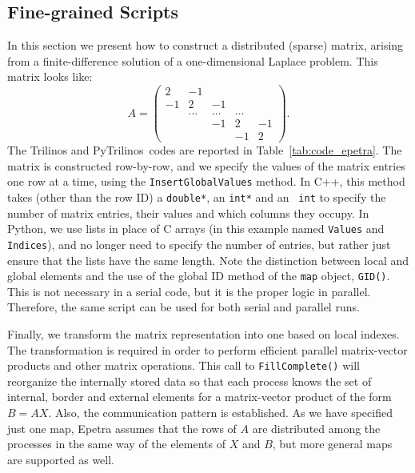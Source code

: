 \documentclass[acmtocl]{acmtrans2m}
\newcommand{\PyTrilinos}{{PyTrilinos}}
\begin{document}
\subsection{Fine-grained Scripts}
\label{sec:fine}

In this section we present how to construct a distributed (sparse)
matrix, arising from a finite-difference solution of a one-dimensional
Laplace problem.  This matrix looks like:
\begin{equation*}
  A = \begin{pmatrix}
     2 & -1     &        &        &    \\
    -1 &  2     & -1     &        &    \\
       & \ldots & \ldots & \ldots &    \\
       &        & -1     & 2      & -1 \\
       &        &        & -1     & 2
  \end{pmatrix}.
\end{equation*}
The Trilinos and \PyTrilinos\ codes are reported in
Table~\ref{tab:code_epetra}.  The matrix is constructed row-by-row,
and we specify the values of the matrix entries one row at a time,
using the {\tt InsertGlobalValues} method.  In C++, this method takes
(other than the row ID) a {\tt double*}, an {\tt int*} and an {\tt
  int} to specify the number of matrix entries, their values and which
columns they occupy.  In Python, we use lists in place of C arrays (in
this example named {\tt Values} and {\tt Indices}), and no longer need
to specify the number of entries, but rather just ensure that the
lists have the same length.  Note the distinction between local and
global elements and the use of the global ID method of the {\tt map}
object, {\tt GID()}.  This is not necessary in a serial code, but it
is the proper logic in parallel.  Therefore, the same script can be
used for both serial and parallel runs.

Finally, we transform the matrix representation into one based on
local indexes.  The transformation is required in order to perform
efficient parallel matrix-vector products and other matrix operations.
This call to {\tt FillComplete()} will reorganize the internally
stored data so that each process knows the set of internal, border and
external elements for a matrix-vector product of the form $B = AX$.
Also, the communication pattern is established.  As we have specified
just one map, Epetra assumes that the rows of $A$ are distributed
among the processes in the same way of the elements of $X$ and $B$,
but more general maps are supported as well.
\end{document}
